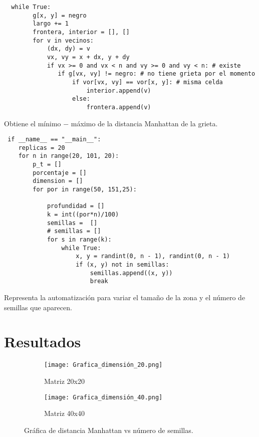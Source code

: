 \documentclass{article}
\begin{document}
\renewcommand{\listingscaption}{Código}
\begin{listing}[H]
  \begin{verbatim}
  while True:
        g[x, y] = negro
        largo += 1
        frontera, interior = [], []
        for v in vecinos:
            (dx, dy) = v
            vx, vy = x + dx, y + dy
            if vx >= 0 and vx < n and vy >= 0 and vy < n: # existe
               if g[vx, vy] != negro: # no tiene grieta por el momento
                   if vor[vx, vy] == vor[x, y]: # misma celda
                       interior.append(v)
                   else:
                       frontera.append(v)
  \end{verbatim}
  \label{lst:fibo}
  \caption{Obtiene el mínimo $-$ máximo de la distancia Manhattan de la grieta.}
\end{listing}

\renewcommand{\listingscaption}{Código}
\begin{listing}[H]
  \begin{verbatim}
 if __name__ == "__main__":
    replicas = 20
    for n in range(20, 101, 20):
        p_t = []
        porcentaje = []
        dimension = []
        for por in range(50, 151,25):
    
            profundidad = []
            k = int((por*n)/100) 
            semillas =  []
            # semillas = []
            for s in range(k):
                while True:
                    x, y = randint(0, n - 1), randint(0, n - 1)
                    if (x, y) not in semillas:
                        semillas.append((x, y))
                        break
  \end{verbatim}
  \label{lst:fibo}
  \caption{Representa la automatización para variar el tamaño de la zona y el número de semillas que aparecen.}
\end{listing}


\section{Resultados}

\begin{figure}[H]
\centering
\begin{subfigure}[b]{0.45\linewidth}
\texttt{[image: Grafica\_dimensión\_20.png]}
\caption{Matriz 20x20}
\end{subfigure}
\begin{subfigure}[b]{0.45\linewidth}
\texttt{[image: Grafica\_dimensión\_40.png]}
\caption{Matriz 40x40}
\end{subfigure}
\caption{Gráfica de distancia Manhattan vs número de semillas.}
\label{fig:westminster}
\end{figure}
\end{document}
